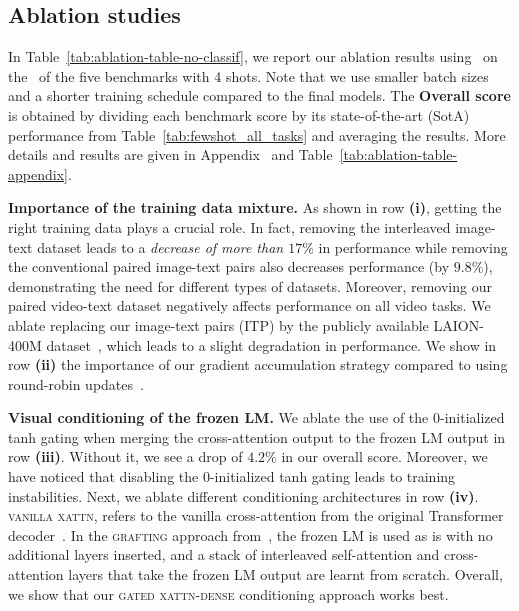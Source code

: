 

\subsection{Ablation studies}
\label{sec:ablations}



In Table~\ref{tab:ablation-table-no-classif}, we report our ablation results using \base{}~on the \metadevsubsets~of the five \dev{} benchmarks with 4 shots.
Note that we use smaller batch sizes and a shorter training schedule compared to the final models.
The \textbf{Overall score} is obtained by dividing each benchmark score by its state-of-the-art (SotA) performance from Table~\ref{tab:fewshot_all_tasks} and averaging the results.
More details and results are given in Appendix~ and Table~\ref{tab:ablation-table-appendix}.

\noindent
\textbf{Importance of the training data mixture.}
As shown in row \textbf{(i)}, getting the right training data plays a crucial role.
In fact, removing the interleaved image-text dataset \mmmw{} leads to a \emph{decrease of more than $17\%$} in performance while removing the conventional paired image-text pairs also decreases performance (by $9.8\%$), demonstrating the need for different types of datasets.
Moreover, removing our paired video-text dataset negatively affects performance on all video tasks.
We ablate replacing our image-text pairs (ITP) by the publicly available LAION-400M dataset~\cite{schuhmann2021laion}, which leads to a slight degradation in performance.
We show in row \textbf{(ii)} the importance of our gradient accumulation strategy compared to using round-robin updates~\citep{cho2021unifying}.

\noindent
\textbf{Visual conditioning of the frozen LM.}
We ablate the use of the 0-initialized tanh gating when merging the cross-attention output to the frozen LM output in row \textbf{(iii)}.
Without it, we see a drop of $4.2\%$ in our overall score.
Moreover, we have noticed that disabling the 0-initialized tanh gating leads to training instabilities.
Next, we ablate different conditioning architectures in row \textbf{(iv)}.
\textsc{vanilla xattn}, refers to the vanilla cross-attention from the original Transformer decoder~\citep{vaswani2017attention}.
In the \textsc{grafting} approach from~\cite{luo2022vc}, the frozen LM is used as is with no additional layers inserted, and a stack of interleaved self-attention and cross-attention layers that take the frozen LM output are learnt from scratch.
Overall, we show that our \textsc{gated xattn-dense} conditioning approach works best.

